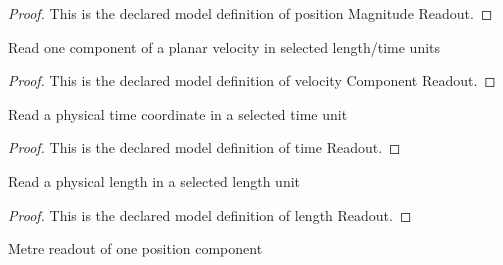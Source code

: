 \begin{proof}
  This is the declared model definition of position Magnitude Readout.
\end{proof}
\begin{definition}
  \label{def:physics:phyx-mini-0679:phyxminiproblems-problemphyxmini0679-velocitycomponentreadout}
  Read one component of a planar velocity in selected length/time units
\end{definition}
\begin{proof}
  This is the declared model definition of velocity Component Readout.
\end{proof}
\begin{definition}
  \label{def:physics:phyx-mini-0679:phyxminiproblems-problemphyxmini0679-timereadout}
  Read a physical time coordinate in a selected time unit
\end{definition}
\begin{proof}
  This is the declared model definition of time Readout.
\end{proof}
\begin{definition}
  \label{def:physics:phyx-mini-0679:phyxminiproblems-problemphyxmini0679-lengthreadout}
  Read a physical length in a selected length unit
\end{definition}
\begin{proof}
  This is the declared model definition of length Readout.
\end{proof}
\begin{definition}
  \label{def:physics:phyx-mini-0679:phyxminiproblems-problemphyxmini0679-positioncomponentinmeters}
  Metre readout of one position component
\end{definition}
